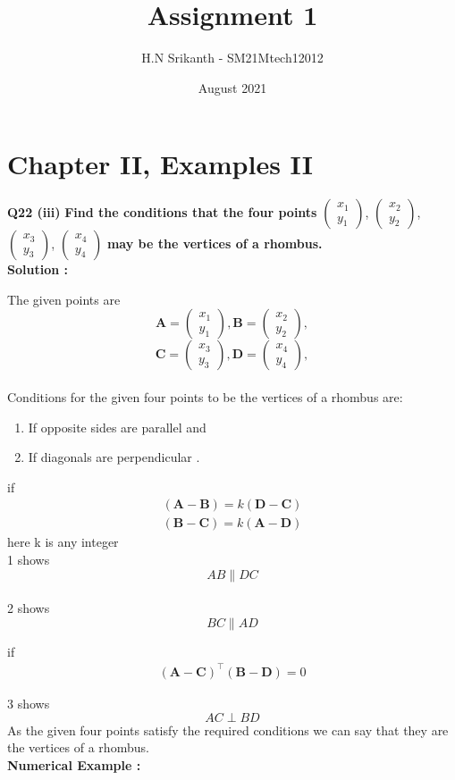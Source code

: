 \documentclass{article}
\title{\textbf{\Huge Assignment 1}}
\author{\large H.N Srikanth - SM21Mtech12012}
\date{August 2021}
\begin{document}
\providecommand{\mbf}{\mathbf}

\newcommand{\myvec}[1]{\ensuremath{\begin{pmatrix}#1\end{pmatrix}}}
\let\vec\mathbf

\maketitle

\section*{Chapter II, Examples II}
\textbf{Q22 (iii)}
\textbf{Find the conditions that the four points}
\myvec{x_1\\y_1}, \myvec{x_2\\y_2},
\myvec{x_3\\y_3}, \myvec{x_4\\y_4}
\textbf{ may be the vertices of a rhombus.}\\

\textbf{Solution :}

The given points are\\

$$\vec{A} = \myvec{x_1\\y_1}, \vec{B} =\myvec{x_2\\y_2},$$
$$\vec{C} =\myvec{x_3\\y_3}, \vec{D} =\myvec{x_4\\y_4},$$\\
Conditions for the given four points to be the vertices of a rhombus are:
\begin{enumerate}
  \item If opposite sides are parallel and
  \item If diagonals are perpendicular .
\end{enumerate}
if
\begin{align}
(\vec{A}-\vec{B} ) = k(\vec{D}-\vec{C} )\\
(\vec{B}-\vec{C} )=k(\vec{A}-\vec{D} )
\end{align}
here k is any integer\\
1 shows 
$$AB \parallel DC $$\\
2 shows 
$$BC \parallel AD$$

if 
\begin{align}
(\vec{A}-\vec{C} )^ \top ( \vec{B}-\vec{D} ) = 0 
\end{align}

3 shows
$$AC \perp BD $$
{As the given four points satisfy the required conditions we can say that they are the vertices of a rhombus.}\\
\textbf{Numerical Example :}
 
\end{document}
